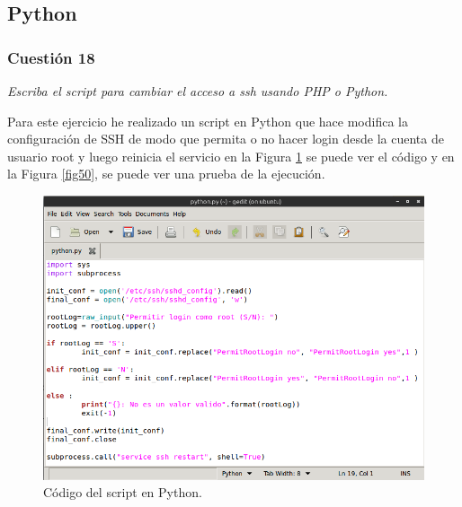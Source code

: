 \subsection{Python}
\subsubsection{Cuestión 18}
\textit{Escriba el script para cambiar el acceso a ssh usando PHP o Python.}

Para este ejercicio he realizado un script en Python que hace modifica la configuración de SSH de modo que permita o no hacer login desde la cuenta de usuario root y luego reinicia el servicio \cite{subp} en la Figura \ref{fig49} se puede ver el código y en la Figura \ref{fig50}, se puede ver una prueba de la ejecución. 

\begin{figure}[H]
    \begin{center}
    \advance\leftskip-1cm
        \includegraphics[scale=0.5]{imagenes/img54}
        \caption{Código del script en Python.}
        \label{fig49}
    \end{center}
\end{figure}

